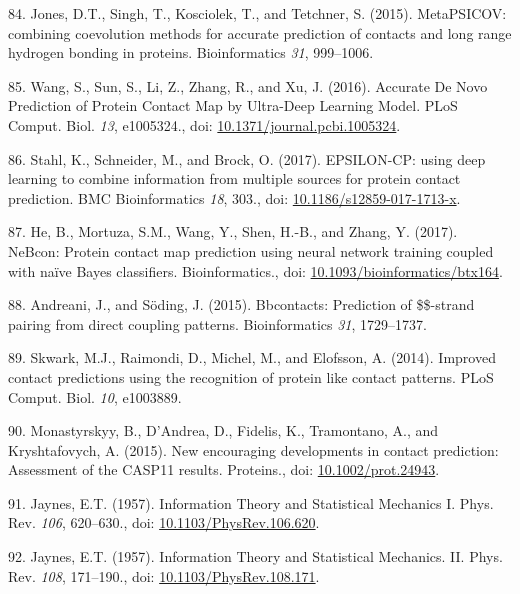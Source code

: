 \documentclass[11pt,a4paper,twoside]{book}
\theoremstyle{definition}
\theoremstyle{definition}
\theoremstyle{remark}
\begin{document}
\hypertarget{ref-Jones2015a}{}
84. Jones, D.T., Singh, T., Kosciolek, T., and Tetchner, S. (2015).
MetaPSICOV: combining coevolution methods for accurate prediction of
contacts and long range hydrogen bonding in proteins. Bioinformatics
\emph{31}, 999--1006.

\hypertarget{ref-Wang2016a}{}
85. Wang, S., Sun, S., Li, Z., Zhang, R., and Xu, J. (2016). Accurate De
Novo Prediction of Protein Contact Map by Ultra-Deep Learning Model.
PLoS Comput. Biol. \emph{13}, e1005324., doi:
\href{https://doi.org/10.1371/journal.pcbi.1005324}{10.1371/journal.pcbi.1005324}.

\hypertarget{ref-Stahl2017}{}
86. Stahl, K., Schneider, M., and Brock, O. (2017). EPSILON-CP: using
deep learning to combine information from multiple sources for protein
contact prediction. BMC Bioinformatics \emph{18}, 303., doi:
\href{https://doi.org/10.1186/s12859-017-1713-x}{10.1186/s12859-017-1713-x}.

\hypertarget{ref-He2017}{}
87. He, B., Mortuza, S.M., Wang, Y., Shen, H.-B., and Zhang, Y. (2017).
NeBcon: Protein contact map prediction using neural network training
coupled with naïve Bayes classifiers. Bioinformatics., doi:
\href{https://doi.org/10.1093/bioinformatics/btx164}{10.1093/bioinformatics/btx164}.

\hypertarget{ref-Andreani2015a}{}
88. Andreani, J., and Söding, J. (2015). Bbcontacts: Prediction of
\$\$-strand pairing from direct coupling patterns. Bioinformatics
\emph{31}, 1729--1737.

\hypertarget{ref-Skwark2014a}{}
89. Skwark, M.J., Raimondi, D., Michel, M., and Elofsson, A. (2014).
Improved contact predictions using the recognition of protein like
contact patterns. PLoS Comput. Biol. \emph{10}, e1003889.

\hypertarget{ref-Monastyrskyy2015}{}
90. Monastyrskyy, B., D'Andrea, D., Fidelis, K., Tramontano, A., and
Kryshtafovych, A. (2015). New encouraging developments in contact
prediction: Assessment of the CASP11 results. Proteins., doi:
\href{https://doi.org/10.1002/prot.24943}{10.1002/prot.24943}.

\hypertarget{ref-Jaynes1957a}{}
91. Jaynes, E.T. (1957). Information Theory and Statistical Mechanics I.
Phys. Rev. \emph{106}, 620--630., doi:
\href{https://doi.org/10.1103/PhysRev.106.620}{10.1103/PhysRev.106.620}.

\hypertarget{ref-Jaynes1957b}{}
92. Jaynes, E.T. (1957). Information Theory and Statistical Mechanics.
II. Phys. Rev. \emph{108}, 171--190., doi:
\href{https://doi.org/10.1103/PhysRev.108.171}{10.1103/PhysRev.108.171}.
\end{document}
